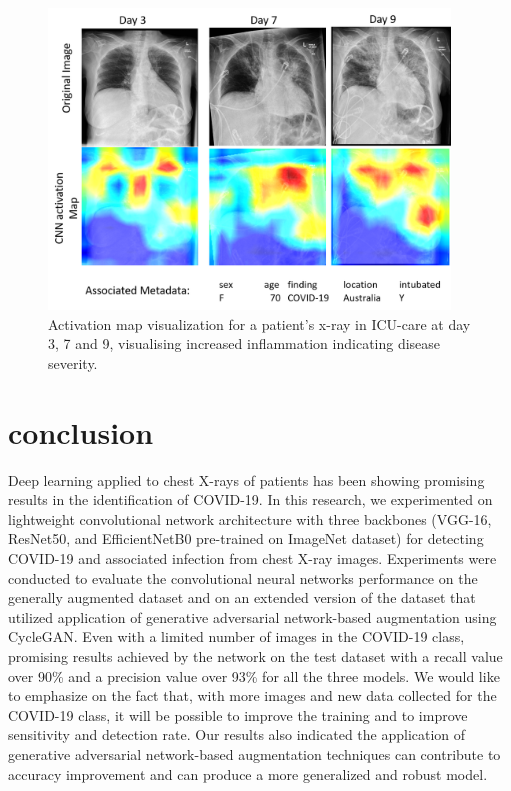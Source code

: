 \begin{figure}
\centering
\includegraphics[width=0.95\textwidth]{images/Picture1_activation map.png}
   \caption{Activation map visualization for a patient's x-ray in ICU-care at day 3, 7 and 9, visualising increased inflammation indicating disease severity.}
\label{fig:activation_map}
\end{figure}

\section{conclusion}
\label{sec:conclusion}
 Deep learning applied to chest X-rays of patients has been showing promising results in the identification of COVID-19. In this research, we experimented on lightweight convolutional network architecture with three backbones (VGG-16, ResNet50, and EfficientNetB0 pre-trained on ImageNet dataset) for detecting COVID-19 and associated infection from chest X-ray images. Experiments were conducted to evaluate the convolutional neural networks performance on the generally augmented dataset and on an extended version of the dataset that utilized application of generative adversarial network-based augmentation using CycleGAN.  Even with a limited number of images in the COVID-19 class, promising results achieved by the network on the test dataset with a recall value over 90\% and a precision value over 93\% for all the three models. We would like to emphasize on the fact that, with more images and new data collected for the COVID-19 class, it will be possible to improve the training and to improve sensitivity and detection rate. Our results also indicated the application of generative adversarial network-based augmentation techniques can contribute to accuracy improvement and can produce a more generalized and robust model.

